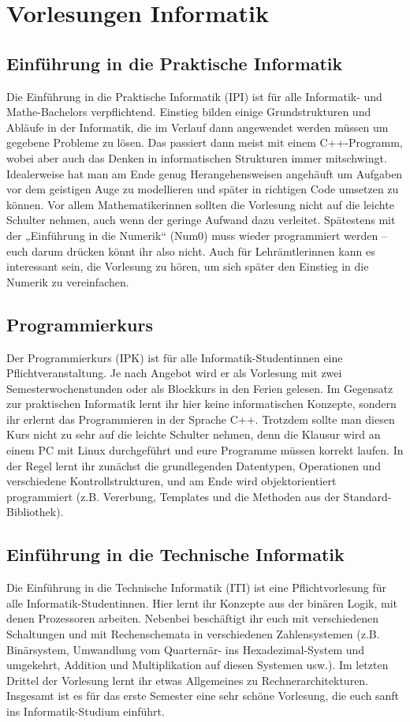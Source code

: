 \section{Vorlesungen Informatik}

\subsection{Einführung in die Praktische Informatik}
\label{info1}
Die Einführung in die Praktische Informatik (\gls{IPI}) ist für alle Informatik- und Mathe-Bachelors verpflichtend. Einstieg bilden einige Grundstrukturen und Abläufe in der Informatik, die im Verlauf dann angewendet werden müssen um gegebene Probleme zu lösen. Das passiert dann meist mit einem C++-Programm, wobei aber auch das Denken in informatischen Strukturen immer mitschwingt. Idealerweise hat man am Ende genug Herangehensweisen angehäuft um Aufgaben vor dem geistigen Auge zu modellieren und später in richtigen Code umsetzen zu können. Vor allem Mathematikerinnen sollten die Vorlesung nicht auf die leichte Schulter nehmen, auch wenn der geringe Aufwand dazu verleitet. Spätestens mit der „Einführung in die Numerik“ (\gls{Num0}) muss wieder programmiert werden -- euch darum drücken könnt ihr also nicht. Auch für Lehrämtlerinnen kann es interessant sein, die Vorlesung zu hören, um sich später den Einstieg in die Numerik zu vereinfachen.

\subsection{Programmierkurs}
\label{ipk}
Der Programmierkurs (\gls{IPK}) ist für alle Informatik-Studentinnen eine Pflichtveranstaltung. Je nach Angebot wird er als Vorlesung mit zwei Semesterwochenstunden oder als Blockkurs in den Ferien gelesen. Im Gegensatz zur praktischen Informatik lernt ihr hier keine informatischen Konzepte, sondern ihr erlernt das Programmieren in der Sprache C++. Trotzdem sollte man diesen Kurs nicht zu sehr auf die leichte Schulter nehmen, denn die Klausur wird an einem PC mit Linux durchgeführt und eure Programme müssen korrekt laufen. In der Regel lernt ihr zunächst die grundlegenden Datentypen, Operationen und verschiedene Kontrollstrukturen, und am Ende wird objektorientiert programmiert (z.B. Vererbung, Templates und die Methoden aus der Standard-Bibliothek).

\subsection{Einführung in die Technische Informatik}
\label{info2}
Die Einführung in die Technische Informatik (\gls{ITI}) ist eine Pflichtvorlesung für alle Informatik-Studentinnen. Hier lernt ihr Konzepte aus der binären Logik, mit denen Prozessoren arbeiten. Nebenbei beschäftigt ihr euch mit verschiedenen Schaltungen und mit Rechenschemata in verschiedenen Zahlensystemen (z.B. Binärsystem, Umwandlung vom Quarternär- ins Hexadezimal-System und umgekehrt, Addition und Multiplikation auf diesen Systemen usw.). Im letzten Drittel der Vorlesung lernt ihr etwas Allgemeines zu Rechnerarchitekturen. Insgesamt ist es für das erste Semester eine sehr schöne Vorlesung, die euch sanft ins Informatik-Studium einführt.


